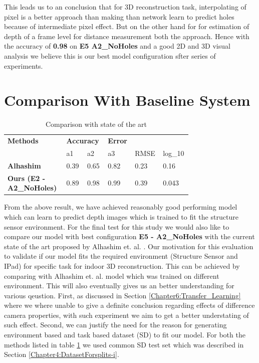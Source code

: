 This leads us to an conclusion that for 3D reconstruction task, interpolating of pixel is a better approach than making than network learn to predict holes because of intermediate pixel effect. But on the other hand for for estimation of depth of a frame level for distance measurement both the approach. Hence with the accuracy of \textbf{0.98} on \textbf{E5 A2\_NoHoles} and a good 2D and 3D visual analysis we believe this is our best model configuration sfter series of experiments.




\newpage
\section{Comparison With Baseline System}
 \label{Chapter6:ComapreS-F-A}

\begin{table}[h]
\centering
\begin{tabular}{p{0.3\linewidth}p{0.1\linewidth}p{0.1\linewidth}p{0.08\linewidth}p{0.08\linewidth}p{0.07\linewidth}} \hline
\textbf{Methods} & \multicolumn{2}{l}{\textbf{Accuracy}} & {\textbf{Error}} \\ \cline{2-6} 
    &  a1& a2  & a3    & RMSE & log\_10   \\ \hline \hline
\textbf{Alhashim} \cite{Alhashim2018}    &  0.39 & 0.65   &  0.82  & 0.23   &   0.16  \\ \hline

\textbf{Ours (E2 - A2\_NoHoles)}     &   0.89 & 0.98 & 0.99   & 0.39  &0.043  \\ \hline

\end{tabular}
\caption{Comparison with state of the art}
\label{table:Results_SFA}
\end{table} 

From the above result, we have achieved reasonably good performing model which can learn to predict depth images which is trained to fit the structure sensor environment. For the final test for this study we would also like to compare our model with best configuration \textbf{E5 - A2\_NoHoles} with the current state of the art proposed by Alhashim et. al. \cite{Alhashim2018}. Our motivation for this evaluation to validate if our model fits the required environment (Structure Sensor and IPad) for specific task for indoor 3D reconstruction. This can be achieved by comparing with Alhashim et. al. model which was trained on different environment. This will also eventually gives us an better understanding for various qeustion. First, as discussed in Section \ref{Chapter6:Transfer_Learning} where we where unable to give a definite conclusion regarding effects of difference camera properties, with such experiment we aim to get a better understating of such effect. Second, we can justify the need for the reason for generating environment based and task based dataset (SD) to fit our model. For both the methods listed in table \ref{table:Results_SFA} we used common SD test set which was described in Section \ref{Chapter4:DatasetForsplits-i}. 



